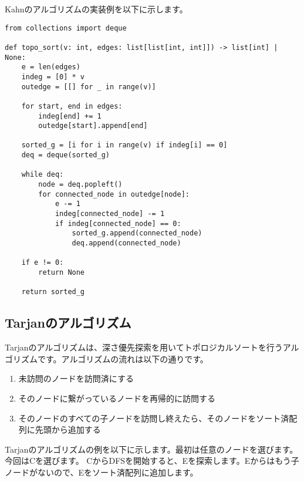 \documentclass{jlreq}
\begin{document}
\vspace{0.5cm}

Kahnのアルゴリズムの実装例を以下に示します。
\begin{lstlisting}[caption=Kahnのアルゴリズムの実装, label=kahn, frame=TRBL, label={kahn}]
from collections import deque

def topo_sort(v: int, edges: list[list[int, int]]) -> list[int] | None:
    e = len(edges)
    indeg = [0] * v
    outedge = [[] for _ in range(v)]
    
    for start, end in edges:
        indeg[end] += 1
        outedge[start].append[end]
    
    sorted_g = [i for i in range(v) if indeg[i] == 0]
    deq = deque(sorted_g)
    
    while deq:
        node = deq.popleft()
        for connected_node in outedge[node]:
            e -= 1
            indeg[connected_node] -= 1
            if indeg[connected_node] == 0: 
                sorted_g.append(connected_node)
                deq.append(connected_node)
    
    if e != 0:
        return None
    
    return sorted_g
\end{lstlisting}

\subsection{Tarjanのアルゴリズム}
Tarjanのアルゴリズムは、深さ優先探索を用いてトポロジカルソートを行うアルゴリズムです。アルゴリズムの流れは以下の通りです。

\begin{enumerate}
  \item 未訪問のノードを訪問済にする
  \item そのノードに繋がっているノードを再帰的に訪問する
  \item そのノードのすべての子ノードを訪問し終えたら、そのノードをソート済配列に先頭から追加する
\end{enumerate}

\newpage

Tarjanのアルゴリズムの例を以下に示します。最初は任意のノードを選びます。今回はCを選びます。
CからDFSを開始すると、Eを探索します。Eからはもう子ノードがないので、Eをソート済配列に追加します。

\vspace{0.5cm}

\begin{center}
\end{center}
\end{document}

